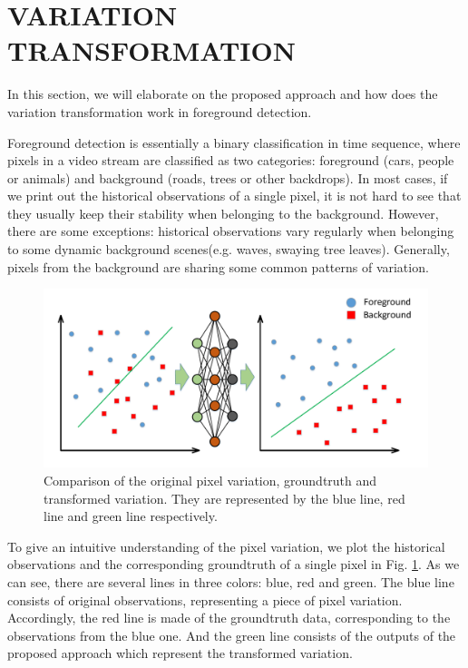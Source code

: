 \documentclass[journal]{IEEEtran}
\newcommand{\reffig}[1]{Fig. \ref{#1}}
\begin{document}
\section{VARIATION TRANSFORMATION}
\label{sec3}
In this section, we will elaborate on the proposed approach and how does the variation transformation work in foreground detection.

Foreground detection is essentially a binary classification in time sequence, where pixels in a video stream are classified as two categories: foreground (cars, people or animals) and background (roads, trees or other backdrops). 
In most cases, if we print out the historical observations of a single pixel, it is not hard to see that they usually keep their stability when belonging to the background. 
However, there are some exceptions: historical observations vary regularly when belonging to some dynamic background scenes(e.g. 
waves, swaying tree leaves). 
Generally, pixels from the background are sharing some common patterns of variation. 
\begin{figure}[!t]	%
\centering
    \includegraphics[width=\linewidth]{figure/fig1}
    \caption{Comparison of the original pixel variation, groundtruth and transformed variation. They are represented by the blue line, red line and green line respectively.}
    \label{variation_chart}
\end{figure}

To give an intuitive understanding of the pixel variation, we plot the historical observations and the corresponding groundtruth of a single pixel in  \reffig{variation_chart}.
As we can see, there are several lines in three colors: blue, red and green. 
The blue line consists of original observations, representing a piece of pixel variation. 
Accordingly, the red line is made of the groundtruth data, corresponding to the observations from the blue one.  
And the green line consists of the outputs of the proposed approach which represent the transformed variation. 
\end{document}
